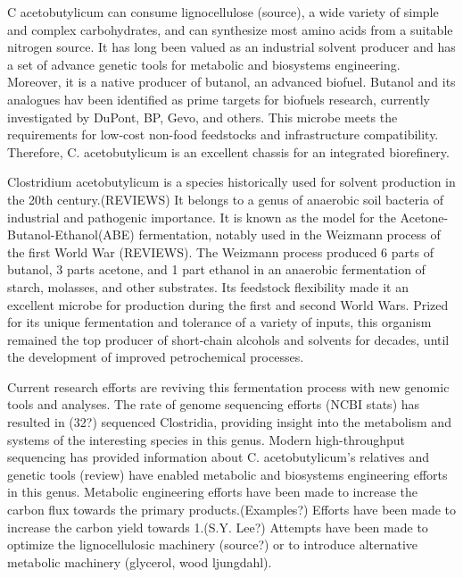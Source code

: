 C acetobutylicum can consume lignocellulose (source), a wide variety of simple and complex carbohydrates, and can synthesize most amino acids from a suitable nitrogen source. It has long been valued as an industrial solvent producer and has a set of advance genetic tools for metabolic and biosystems engineering. Moreover, it is a native producer of butanol, an advanced biofuel. Butanol and its analogues hav been identified as prime targets for biofuels research, currently investigated by DuPont, BP, Gevo, and others. This microbe meets the requirements for low-cost non-food feedstocks and infrastructure compatibility. Therefore, C. acetobutylicum is an excellent chassis for an integrated biorefinery.

Clostridium acetobutylicum is a species historically used for solvent production in the 20th century.(REVIEWS) It belongs to a genus of anaerobic soil bacteria of industrial and pathogenic importance. It is known as the model for the Acetone-Butanol-Ethanol(ABE) fermentation, notably used in the Weizmann process of the first World War (REVIEWS). The Weizmann process produced 6 parts of butanol, 3 parts acetone, and 1 part ethanol in an anaerobic fermentation of starch, molasses, and other substrates. Its feedstock flexibility made it an excellent microbe for production during the first and second World Wars. Prized for its unique fermentation and tolerance of a variety of inputs, this organism remained the top producer of short-chain alcohols and solvents for decades, until the development of improved petrochemical processes.

Current research efforts are reviving this fermentation process with new genomic tools and analyses. The rate of genome sequencing efforts (NCBI stats) has resulted in (32?) sequenced Clostridia, providing insight into the metabolism and systems of the interesting species in this genus. Modern high-throughput sequencing has provided information about C. acetobutylicum's relatives and genetic tools (review) have enabled metabolic and biosystems engineering efforts in this genus. Metabolic engineering efforts have been made to increase the carbon flux towards the primary products.(Examples?) Efforts have been made to increase the carbon yield towards 1.(S.Y. Lee?) Attempts have been made to optimize the lignocellulosic machinery (source?) or to introduce alternative metabolic machinery (glycerol, wood ljungdahl).

